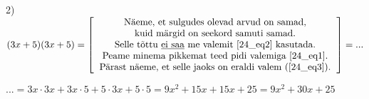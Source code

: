 \begin{center}
{{{\begin{flushleft}
\vspace{5mm}
\hspace{5mm}
2) $(3x+5)(3x+5)=\left[\begin{tabular}{c}
Näeme, et sulgudes olevad arvud on samad,\\
kuid märgid on seekord samuti samad.\\
Selle tõttu \underline{ei saa} me valemit \ref{24_eq2} kasutada.\\
Peame minema pikkemat teed pidi valemiga \ref{24_eq1}.\\
Pärast näeme, et selle jaoks on eraldi valem (\ref{24_eq3}).
\end{tabular} \right]=...$

\vspace{5mm}
\hspace{5mm}
$...= 3x\cdot 3x + 3x \cdot 5+ 5 \cdot 3x+ 5 \cdot 5 = 9x^{2}+15x+15x+25=9x^{2}+30x+25$
\end{flushleft}
}}}
\end{center}

